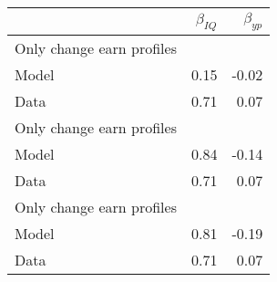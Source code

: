 \begin{tabular}{lrr}
\hline
  & $\beta_{IQ}$  & $\beta_{yp}$  \\
\hline
Only change earn profiles &   &   \\
Model & 0.15  & -0.02  \\
Data & 0.71  & 0.07  \\
Only change earn profiles &   &   \\
Model & 0.84  & -0.14  \\
Data & 0.71  & 0.07  \\
Only change earn profiles &   &   \\
Model & 0.81  & -0.19  \\
Data & 0.71  & 0.07  \\
\hline
\end{tabular}%

